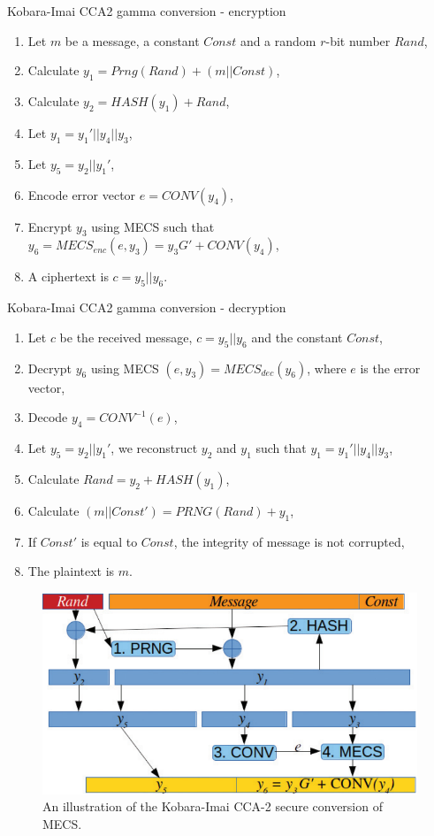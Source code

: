 \begin{algorithm}[H]
	\caption{Kobara-Imai CCA2 gamma conversion - encryption}
	\label{kobara-enc}
	\begin{enumerate}
		\item Let $m$ be a message, a constant $Const$ and a random $r$-bit number $Rand$,
		\item Calculate $y_1 = Prng(Rand) + (m || Const)$,
		\item Calculate $y_2 = HASH(y_1) + Rand$,
		\item Let $y_1 = y_1' || y_4 || y_3$,
		\item Let $y_5 = y_2 || y_1'$, 
		\item Encode error vector $e = CONV(y_4)$,
		\item Encrypt $y_3$ using MECS such that $y_6 = MECS_{enc}(e, y_3) = y_3G' + CONV(y_4)$, 
		\item A ciphertext is $c = y_5 || y_6$.
	\end{enumerate}
\end{algorithm}


\begin{algorithm}[H]
	\caption{Kobara-Imai CCA2 gamma conversion - decryption}
	\label{kobara-dec}
	\begin{enumerate}
		\item Let $c$ be the received message, $c = y_5 || y_6$ and the constant $Const$,
		\item Decrypt $y_6$ using MECS $(e, y_3) = MECS_{dec}(y_6)$, where $e$ is the error vector,
		\item Decode $y_4 = CONV^{-1}(e)$,
		\item Let $y_5 = y_2 || y_1'$, we reconstruct $y_2$ and $y_1$ such that $y_1 = y_1' || y_4 || y_3$,
		\item Calculate $Rand = y_2 + HASH(y_1)$,
		\item Calculate $(m||Const') = PRNG(Rand) + y_1$,
		\item If $Const'$ is equal to $Const$, the integrity of message is not corrupted,
		\item The plaintext is $m$.
	\end{enumerate}
\end{algorithm}

  
 \begin{figure}[!htbp]
 	\centering
 	\includegraphics[width=12cm]{img/kobaraImai.png}
 	\caption{An illustration of the Kobara-Imai CCA-2 secure conversion of MECS.}
 	\label{kobara-imai}
 \end{figure}
 
